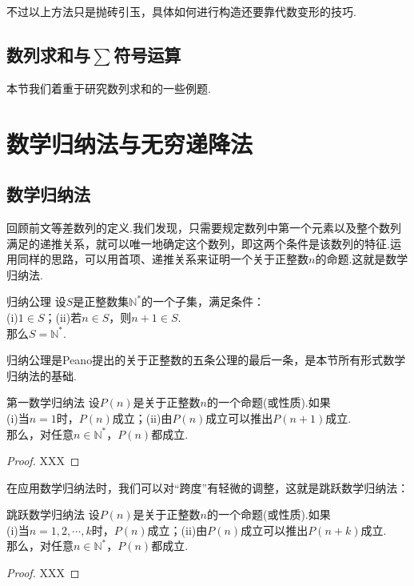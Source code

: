 \documentclass[lang=cn, zihao=4.5]{elegantbook}
\begin{document}
不过以上方法只是抛砖引玉，具体如何进行构造还要靠代数变形的技巧.

\subsection{数列求和与$\sum$符号运算}

本节我们着重于研究数列求和的一些例题.

\section{数学归纳法与无穷递降法}

\subsection{数学归纳法}

回顾前文等差数列的定义.我们发现，只需要规定数列中第一个元素以及整个数列满足的递推关系，就可以唯一地确定这个数列，即这两个条件是该数列的特征.运用同样的思路，可以用首项、递推关系来证明一个关于正整数$n$的命题.这就是数学归纳法.

\begin{axiom}{归纳公理}
	设$S$是正整数集$\mathbb{N}^{*}$的一个子集，满足条件： \\
	(i)$1 \in S$；(ii)若$n \in S$，则$n+1 \in S$. \\
	那么$S = \mathbb{N}^{*}$.
\end{axiom}
\begin{remark}
	归纳公理是Peano提出的关于正整数的五条公理的最后一条，是本节所有形式数学归纳法的基础.
\end{remark}

\begin{theorem}{第一数学归纳法}
	设$P(n)$是关于正整数$n$的一个命题(或性质).如果 \\
	(i)当$n=1$时，$P(n)$成立；(ii)由$P(n)$成立可以推出$P(n+1)$成立. \\
	那么，对任意$n \in \mathbb{N}^{*}$，$P(n)$都成立.
\end{theorem}
\begin{proof}
	XXX
\end{proof}

在应用数学归纳法时，我们可以对“跨度”有轻微的调整，这就是跳跃数学归纳法：

\begin{corollary}{跳跃数学归纳法}
	设$P(n)$是关于正整数$n$的一个命题(或性质).如果 \\
	(i)当$n=1,2, \cdots ,k$时，$P(n)$成立；(ii)由$P(n)$成立可以推出$P(n+k)$成立. \\
	那么，对任意$n \in \mathbb{N}^{*}$，$P(n)$都成立.
\end{corollary}
\begin{proof}
	XXX
\end{proof}
\end{document}
